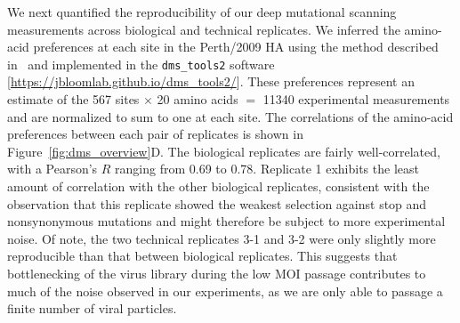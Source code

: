 \documentclass[11pt]{article}
\begin{document}
We next quantified the reproducibility of our deep mutational scanning measurements across biological and technical replicates. 
We inferred the amino-acid preferences at each site in the Perth/2009 HA using the method described in~\cite{bloom2015software} and implemented in the \texttt{dms\_tools2} software [\url{https://jbloomlab.github.io/dms_tools2/}].
These preferences represent an estimate of the 567 sites $\times$ 20 amino acids $=$ 11340 experimental measurements and are normalized to sum to one at each site.
The correlations of the amino-acid preferences between each pair of replicates is shown in Figure~\ref{fig:dms_overview}D.
The biological replicates are fairly well-correlated, with a Pearson's $R$ ranging from 0.69 to 0.78. 
Replicate 1 exhibits the least amount of correlation with the other biological replicates, consistent with the observation that this replicate showed the weakest selection against stop and nonsynonymous mutations and might therefore be subject to more experimental noise.
Of note, the two technical replicates 3-1 and 3-2 were only slightly more reproducible than that between biological replicates.
This suggests that bottlenecking of the virus library during the low MOI passage contributes to much of the noise observed in our experiments, as we are only able to passage a finite number of viral particles.
\end{document}

